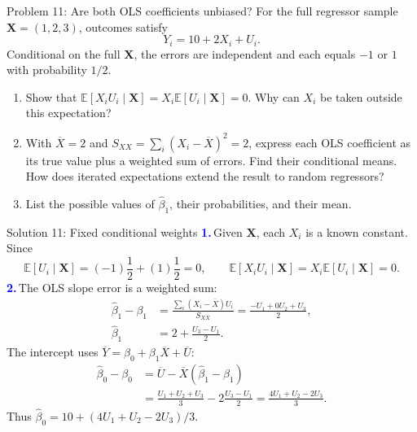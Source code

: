 \documentclass[notes,10pt, aspectratio=169]{beamer}
\newif\ifshowsolutions
\newcommand{\E}{\mathbb{E}}
\newcommand{\answerpart}[1]{\textcolor{blue}{\textbf{#1.}}\,}
\begin{document}
\begin{frame}{Problem 11: Are both OLS coefficients unbiased?}
For the full regressor sample $\mathbf X=(1,2,3)$, outcomes satisfy
\[
Y_i=10+2X_i+U_i.
\]
Conditional on the full $\mathbf X$, the errors are independent and each equals $-1$ or $1$ with probability $1/2$.
\begin{enumerate}
\setlength{\itemsep}{7pt}
\item Show that $\E[X_iU_i\mid\mathbf X]=X_i\E[U_i\mid\mathbf X]=0$. Why can $X_i$ be taken outside this expectation?
\item With $\overline X=2$ and $S_{XX}=\sum_i(X_i-\overline X)^2=2$, express each OLS coefficient as its true value plus a weighted sum of errors. Find their conditional means. How does iterated expectations extend the result to random regressors?
\item List the possible values of $\widehat\beta_1$, their probabilities, and their mean.
\end{enumerate}
\end{frame}

\ifshowsolutions
\begin{frame}{Solution 11: Fixed conditional weights}
\small
\answerpart{1}Given $\mathbf X$, each $X_i$ is a known constant. Since
\[
\E[U_i\mid\mathbf X]=(-1)\frac12+(1)\frac12=0,
\qquad
\E[X_iU_i\mid\mathbf X]=X_i\E[U_i\mid\mathbf X]=\boxed0.
\]
\answerpart{2}The OLS slope error is a weighted sum:
\begin{align*}
\widehat\beta_1-\beta_1
&=\frac{\sum_i(X_i-\overline X)U_i}{S_{XX}}
=\frac{-U_1+0U_2+U_3}{2},\\
\widehat\beta_1&=\boxed{2+\frac{U_3-U_1}{2}}.
\end{align*}
The intercept uses $\overline Y=\beta_0+\beta_1\overline X+\overline U$:
\begin{align*}
\widehat\beta_0-\beta_0
&=\overline U-\overline X(\widehat\beta_1-\beta_1)\\
&=\frac{U_1+U_2+U_3}{3}-2\frac{U_3-U_1}{2}
=\frac{4U_1+U_2-2U_3}{3}.
\end{align*}
Thus $\boxed{\widehat\beta_0=10+(4U_1+U_2-2U_3)/3}$.
\end{frame}
\end{document}

